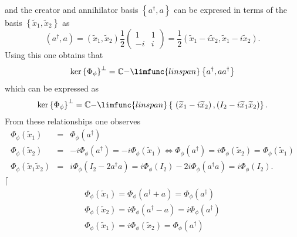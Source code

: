\documentclass[aps,preprint]{revtex4}
\begin{document}
and the creator and annihilator basis $\left\{ a^{\dagger },a\right\} $ can
be expresed in terms of the basis $\left\{ \widetilde{x}_{1},\widetilde{x}%
_{2}\right\} $ as 
\begin{equation}
\left( a^{\dagger },a\right) =\left( \widetilde{x}_{1},\widetilde{x}%
_{2}\right) \frac{1}{2}\left( 
\begin{array}{cc}
1 & 1 \\ 
-i & i%
\end{array}%
\right) =\frac{1}{2}\left( \widetilde{x}_{1}-i\widetilde{x}_{2},\widetilde{x}%
_{1}-i\widetilde{x}_{2}\right) .
\end{equation}%
Using this one obtains that 
\begin{equation}
\ker \left\{ \Phi _{\phi }\right\} ^{\bot }=\mathbb{C-}\limfunc{linspan}%
\left\{ a^{\dagger },aa^{\dagger }\right\}
\end{equation}%
which can be expressed as 
\begin{equation}
\ker \left\{ \Phi _{\phi }\right\} ^{\bot }=\mathbb{C-}\limfunc{linspan}%
\left\{ \ \left( \widetilde{x}_{1}-i\widetilde{x}_{2}\right) ,\left( I_{2}-i%
\widetilde{x}_{1}\widetilde{x}_{2}\right) \right\} .
\end{equation}%
From these relationships one observes 
\begin{eqnarray}
\Phi _{\phi }\left( \widetilde{x}_{1}\right) &=&\Phi _{\phi }\left(
a^{\dagger }\right) \\
\Phi _{\phi }\left( \widetilde{x}_{2}\right) &=&-i\Phi _{\phi }\left(
a^{\dagger }\right) =-i\Phi _{\phi }\left( \widetilde{x}_{1}\right)
\Leftrightarrow \Phi _{\phi }\left( a^{\dagger }\right) =i\Phi _{\phi
}\left( \widetilde{x}_{2}\right) =\Phi _{\phi }\left( \widetilde{x}%
_{1}\right) \\
\Phi _{\phi }\left( \widetilde{x}_{1}\widetilde{x}_{2}\right) &=&i\Phi
_{\phi }\left( I_{2}-2a^{\dagger }a\right) =i\Phi _{\phi }\left(
I_{2}\right) -2i\Phi _{\phi }\left( a^{\dagger }a\right) =i\Phi _{\phi
}\left( I_{2}\right) .
\end{eqnarray}%
$\lceil $%
\begin{gather}
\Phi _{\phi }\left( \widetilde{x}_{1}\right) =\Phi _{\phi }\left( a^{\dagger
}+a\right) =\Phi _{\phi }\left( a^{\dagger }\right) \\
\Phi _{\phi }\left( \widetilde{x}_{2}\right) =i\Phi _{\phi }\left(
a^{\dagger }-a\right) =i\Phi _{\phi }\left( a^{\dagger }\right) \\
\Phi _{\phi }\left( \widetilde{x}_{1}\right) =i\Phi _{\phi }\left( 
\widetilde{x}_{2}\right) =\Phi _{\phi }\left( a^{\dagger }\right)
\end{gather}%
\end{document}
